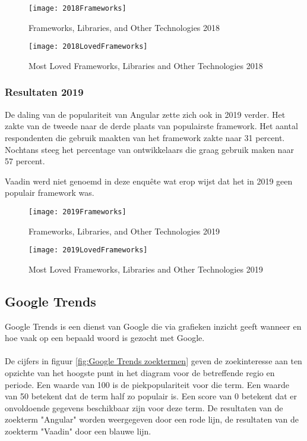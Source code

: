 \begin{figure}[H]
	\centering
	\texttt{[image: 2018Frameworks]}
	\caption{Frameworks, Libraries, and Other Technologies 2018 \autocite{DeveloperSurvey2018}}
	\label{fig:Frameworks, Libraries, and Other Technologies 2018}
\end{figure}

\begin{figure}[H]
	\centering
	\texttt{[image: 2018LovedFrameworks]}
	\caption{Most Loved Frameworks, Libraries and Other Technologies 2018 \autocite{DeveloperSurvey2018}}
	\label{fig:Most Loved Frameworks, Libraries and Other Technologies 2018}
\end{figure}

\subsubsection{Resultaten 2019}
De daling van de populariteit van Angular zette zich ook in 2019 verder. Het zakte van de tweede naar de derde plaats van populairste framework. Het aantal respondenten die gebruik maakten van het framework zakte naar 31 percent. Nochtans steeg het percentage van ontwikkelaars die graag gebruik maken naar 57 percent.

Vaadin werd niet genoemd in deze enquête wat erop wijst dat het in 2019 geen populair framework was.

\begin{figure}[H]
	\centering
	\texttt{[image: 2019Frameworks]}
	\caption{Frameworks, Libraries, and Other Technologies 2019 \autocite{DeveloperSurvey2019}}
	\label{fig:Frameworks, Libraries, and Other Technologies 2019}
\end{figure}

\begin{figure}[H]
	\centering
	\texttt{[image: 2019LovedFrameworks]}
	\caption{Most Loved Frameworks, Libraries and Other Technologies 2019 \autocite{DeveloperSurvey2019}}
	\label{fig:Most Loved Frameworks, Libraries and Other Technologies 2019}
\end{figure}

\subsection{Google Trends}

Google Trends is een dienst van Google die via grafieken inzicht geeft wanneer en hoe vaak op een bepaald woord is gezocht met Google. \\ \\
De cijfers in figuur \ref{fig:Google Trends zoektermen} geven de zoekinteresse aan ten opzichte van het hoogste punt in het diagram voor de betreffende regio en periode. Een waarde van 100 is de piekpopulariteit voor die term. Een waarde van 50 betekent dat de term half zo populair is. Een score van 0 betekent dat er onvoldoende gegevens beschikbaar zijn voor deze term. De resultaten van de zoekterm "Angular" worden weergegeven door een rode lijn, de resultaten van de zoekterm "Vaadin" door een blauwe lijn.

